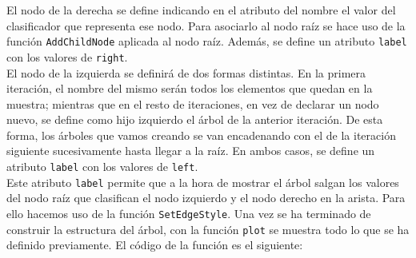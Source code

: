 \documentclass[12pt]{report}\usepackage[]{graphicx}\usepackage[dvipsnames]{xcolor}
\begin{document}
 			El nodo de la derecha se define indicando en el atributo del nombre el valor del clasificador que representa ese nodo. Para asociarlo al nodo raíz se hace uso de la función \texttt{AddChildNode} aplicada al nodo raíz. Además, se define un atributo \texttt{label} con los valores de \texttt{right}.\\
 			
 			El nodo de la izquierda se definirá de dos formas distintas. En la primera iteración, el nombre del mismo serán todos los elementos que quedan en la muestra; mientras que en el resto de iteraciones, en vez de declarar un nodo nuevo, se define como hijo izquierdo el árbol de la anterior iteración. De esta forma, los árboles que vamos creando se van encadenando con el de la iteración siguiente sucesivamente hasta llegar a la raíz. En ambos casos, se define un atributo \texttt{label} con los valores de \texttt{left}.\\
 			
 			Este atributo \texttt{label} permite que a la hora de mostrar el árbol salgan los valores del nodo raíz que clasifican el nodo izquierdo y el nodo derecho en la arista. Para ello hacemos uso de la función \texttt{SetEdgeStyle}. Una vez se ha terminado de construir la estructura del árbol, con la función \texttt{plot} se muestra todo lo que se ha definido previamente. El código de la función es el siguiente: 
 			
\end{document}
